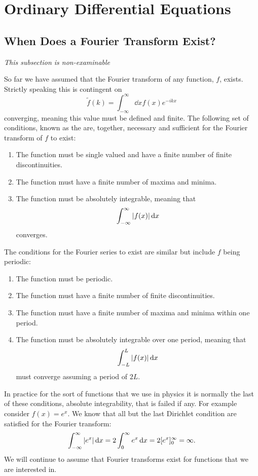 \documentclass[a4paper]{article}
\begin{document}
    \section{Ordinary Differential Equations}
    \subsection{When Does a Fourier Transform Exist?}
    \textit{This subsection is non-examinable}
    
    So far we have assumed that the Fourier transform of any function, \(f\), exists.
    Strictly speaking this is contingent on
    \[\tilde{f}(k) = \int_{-\infty}^{\infty} \dd{x} f(x)e^{-ikx}\]
    converging, meaning this value must be defined and finite.
    The following set of conditions, known as the  are, together, necessary and sufficient for the Fourier transform of \(f\) to exist:
    \begin{enumerate}
        \item The function must be single valued and have a finite number of finite discontinuities.
        \item The function must have a finite number of maxima and minima.
        \item The function must be absolutely integrable, meaning that
        \[\int_{-\infty}^{\infty} \abs{f(x)} \dd{x}\]
        converges.
    \end{enumerate}
    The conditions for the Fourier series to exist are similar but include \(f\) being periodic:
    \begin{enumerate}
        \item The function must be periodic.
        \item The function must have a finite number of finite discontinuities.
        \item The function must have a finite number of maxima and minima within one period.
        \item The function must be absolutely integrable over one period, meaning that
        \[\int_{-L}^{L} \abs{f(x)} \dd{x}\]
        must converge assuming a period of \(2L\).
    \end{enumerate}
    In practice for the sort of functions that we use in physics it is normally the last of these conditions, absolute integrability, that is failed if any.
    For example consider \(f(x) = e^x\).
    We know that all but the last Dirichlet condition are satisfied for the Fourier transform:
    \[\int_{-\infty}^{\infty} \abs{e^x} \dd{x} = 2\int_{0}^{\infty} e^x \dd{x} = 2[e^x]_{0}^{\infty} = \infty.\]
    We will continue to assume that Fourier transforms exist for functions that we are interested in.
    
\end{document}
